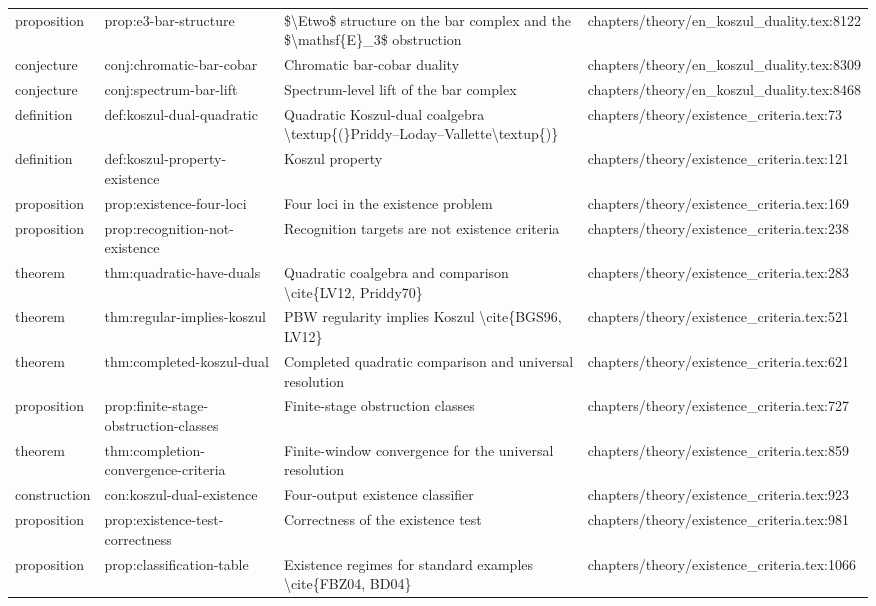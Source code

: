 \documentclass[11pt]{article}
\begin{document}
\begin{longtable}{L{0.10\textwidth}L{0.26\textwidth}L{0.42\textwidth}L{0.22\textwidth}}
proposition & prop:e3-bar-structure & \$\textbackslash{}Etwo\$ structure on the bar complex and the \$\textbackslash{}mathsf\{E\}\_3\$ obstruction & chapters/theory/en\_koszul\_duality.tex:8122\\
conjecture & conj:chromatic-bar-cobar & Chromatic bar-cobar duality & chapters/theory/en\_koszul\_duality.tex:8309\\
conjecture & conj:spectrum-bar-lift & Spectrum-level lift of the bar complex & chapters/theory/en\_koszul\_duality.tex:8468\\
definition & def:koszul-dual-quadratic & Quadratic Koszul-dual coalgebra \textbackslash{}textup\{(\}Priddy--Loday--Vallette\textbackslash{}textup\{)\} & chapters/theory/existence\_criteria.tex:73\\
definition & def:koszul-property-existence & Koszul property & chapters/theory/existence\_criteria.tex:121\\
proposition & prop:existence-four-loci & Four loci in the existence problem & chapters/theory/existence\_criteria.tex:169\\
proposition & prop:recognition-not-existence & Recognition targets are not existence criteria & chapters/theory/existence\_criteria.tex:238\\
theorem & thm:quadratic-have-duals & Quadratic coalgebra and comparison \textbackslash{}cite\{LV12, Priddy70\} & chapters/theory/existence\_criteria.tex:283\\
theorem & thm:regular-implies-koszul & PBW regularity implies Koszul \textbackslash{}cite\{BGS96, LV12\} & chapters/theory/existence\_criteria.tex:521\\
theorem & thm:completed-koszul-dual & Completed quadratic comparison and universal resolution & chapters/theory/existence\_criteria.tex:621\\
proposition & prop:finite-stage-obstruction-classes & Finite-stage obstruction classes & chapters/theory/existence\_criteria.tex:727\\
theorem & thm:completion-convergence-criteria & Finite-window convergence for the universal resolution & chapters/theory/existence\_criteria.tex:859\\
construction & con:koszul-dual-existence & Four-output existence classifier & chapters/theory/existence\_criteria.tex:923\\
proposition & prop:existence-test-correctness & Correctness of the existence test & chapters/theory/existence\_criteria.tex:981\\
proposition & prop:classification-table & Existence regimes for standard examples \textbackslash{}cite\{FBZ04, BD04\} & chapters/theory/existence\_criteria.tex:1066\\

\end{longtable}
\end{document}
